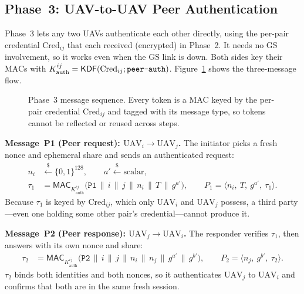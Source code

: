 \documentclass[11pt,a4paper]{article}
\begin{document}
\subsection{Phase~3: UAV-to-UAV Peer Authentication}
\label{subsec:phase3}

Phase~3 lets any two UAVs authenticate each other directly, using the per-pair
credential $\text{Cred}_{ij}$ that each received (encrypted) in Phase~2. It
needs no GS involvement, so it works even when the GS link is down. Both sides
key their MACs with
$K^{ij}_{\text{auth}}=\mathsf{KDF}(\text{Cred}_{ij};\texttt{peer\text{-}auth})$.
Figure~\ref{fig:phase3} shows the three-message flow.

\begin{figure}[H]
\centering
{}
\caption{Phase~3 message sequence. Every token is a MAC keyed by the per-pair
credential $\text{Cred}_{ij}$ and tagged with its message type, so tokens
cannot be reflected or reused across steps.}
\label{fig:phase3}
\end{figure}

\textbf{Message~P1 (Peer request): $\text{UAV}_i \rightarrow \text{UAV}_j$.}
The initiator picks a fresh nonce and ephemeral share and sends an
authenticated request:
\begin{align}
n_i &\xleftarrow{\$} \{0,1\}^{128}, \qquad a' \xleftarrow{\$} \text{scalar}, \\[1ex]
\tau_1 &= \mathsf{MAC}_{K^{ij}_{\text{auth}}}\big(\texttt{P1}\,\|\,i\,\|\,j\,\|\,n_i\,\|\,T\,\|\,g^{a'}\big), \qquad
P_1 = \langle n_i,\ T,\ g^{a'},\ \tau_1 \rangle.
\end{align}
Because $\tau_1$ is keyed by $\text{Cred}_{ij}$, which only $\text{UAV}_i$ and
$\text{UAV}_j$ possess, a third party---even one holding some other pair's
credential---cannot produce it.

\textbf{Message~P2 (Peer response): $\text{UAV}_j \rightarrow \text{UAV}_i$.}
The responder verifies $\tau_1$, then answers with its own nonce and share:
\begin{align}
\tau_2 &= \mathsf{MAC}_{K^{ij}_{\text{auth}}}\big(\texttt{P2}\,\|\,i\,\|\,j\,\|\,n_i\,\|\,n_j\,\|\,g^{a'}\,\|\,g^{b'}\big), \qquad
P_2 = \langle n_j,\ g^{b'},\ \tau_2 \rangle.
\end{align}
$\tau_2$ binds both identities and both nonces, so it authenticates
$\text{UAV}_j$ to $\text{UAV}_i$ and confirms that both are in the same fresh
session.
\end{document}

